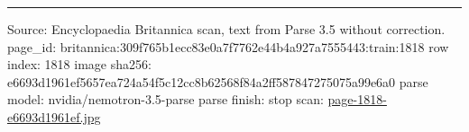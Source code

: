 \documentclass[10pt]{article}
\begin{document}
\vfill\par\noindent\rule{\linewidth}{0.4pt}\par
{\scriptsize\color{gray}\noindent Source: Encyclopaedia Britannica scan, text from Parse 3.5 without correction. page\_id: britannica:309f765b1ecc83e0a7f7762e44b4a927a7555443:train:1818 \quad row index: 1818 \quad image sha256: e6693d1961ef5657ea724a54f5c12cc8b62568f84a2ff587847275075a99e6a0 \quad parse model: nvidia/nemotron-3.5-parse \quad parse finish: stop \quad scan: \href{../scans/page-1818-e6693d1961ef.jpg}{page-1818-e6693d1961ef.jpg}\par}
\end{document}
